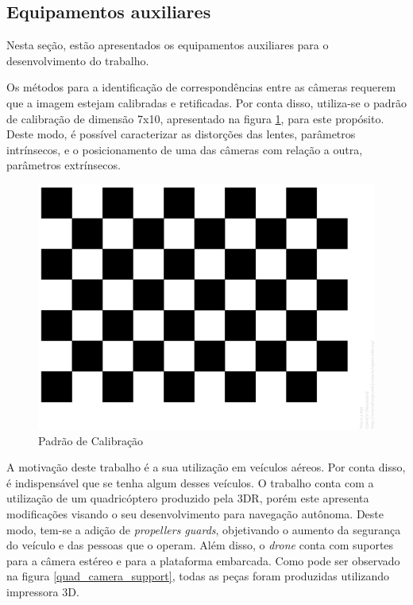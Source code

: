 \subsection{Equipamentos auxiliares}

Nesta seção, estão apresentados os equipamentos auxiliares para o desenvolvimento do trabalho. 

Os métodos para a identificação de correspondências entre as câmeras requerem que a imagem estejam calibradas e retificadas. Por conta disso, utiliza-se o padrão de calibração de dimensão 7x10, apresentado na figura \ref{calibration_pattern}, para este propósito. Deste modo, é possível caracterizar as distorções das lentes, parâmetros intrínsecos, e o posicionamento de uma das câmeras com relação a outra, parâmetros extrínsecos.  

\begin{figure}[H]
	\centering
	\includegraphics[scale=0.10]{./Resources/calibration_pattern.png}
	\caption{Padrão de Calibração}
	\label{calibration_pattern}
\end{figure}

A motivação deste trabalho é a sua utilização em veículos aéreos. Por conta disso, é indispensável que se tenha algum desses veículos. O trabalho conta com a utilização de um quadricóptero produzido pela 3DR, porém este apresenta modificações visando o seu desenvolvimento para navegação autônoma. Deste modo, tem-se a adição de \textit{propellers guards}, objetivando o aumento da segurança do veículo e das pessoas que o operam. Além disso, o \textit{drone} conta com suportes para a câmera estéreo e para a plataforma embarcada. Como pode ser observado na figura \ref{quad_camera_support}, todas as peças foram produzidas utilizando impressora 3D.

